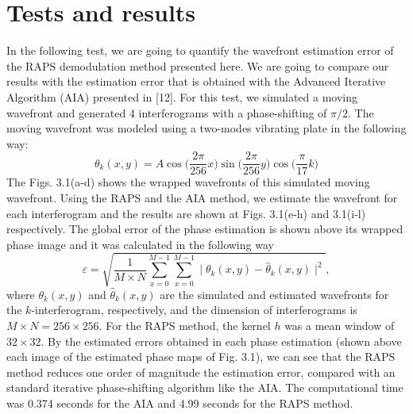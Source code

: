 \section{Tests and results}

In the following test, we are going to quantify the wavefront estimation error
of the RAPS demodulation method presented here. We are going to compare our
results with the estimation error that is obtained with the Advanced Iterative
Algorithm (AIA) presented in [12]. For this test, we simulated a moving
wavefront and generated 4 interferograms with a phase-shifting of $\pi/2$. The
moving wavefront was modeled using a two-modes vibrating plate in the following
way:
\begin{equation}
 \theta_k (x,y) = A \cos \Big( \frac{2\pi}{256}x \Big) \sin \Big(
\frac{2\pi}{256}y \Big) \cos \Big( \frac{\pi}{17}k \Big)
\end{equation}
The Figs. 3.1(a-d) shows the wrapped wavefronts of this simulated moving
wavefront. Using the RAPS and the AIA method, we estimate the wavefront for each
interferogram and the results are shown at Figs. 3.1(e-h) and 3.1(i-l)
respectively. The global error of the phase estimation is shown above its
wrapped phase image and it was calculated in the following way
\begin{equation}
 \varepsilon = \sqrt{\frac{1}{M \times N} 
 \sum_{x=0}^{M-1} \sum_{x=0}^{M-1} 
 \mid \theta_{k}(x,y)-\hat{\theta}_{k}(x,y) \mid^2},
\end{equation}
where $\theta_{k}(x,y)$ and $\hat{\theta}_{k}(x,y)$ are the simulated and
estimated wavefronts for the $k$-interferogram, respectively, and the dimension
of interferograms is $M\times N = 256 \times 256$. For the RAPS method, the
kernel $h$ was a mean window of $32 \times 32$. By the estimated errors obtained
in each phase estimation (shown above each image of the estimated phase maps of
Fig. 3.1), we can see that the RAPS method reduces one order of magnitude the
estimation error, compared with an standard iterative phase-shifting algorithm
like the AIA. The computational time was 0.374 seconds for the AIA and 4.99
seconds for the RAPS method.

